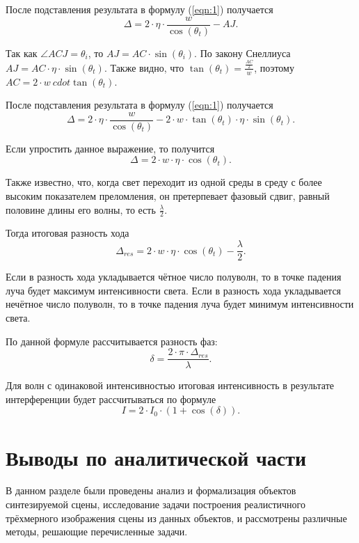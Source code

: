 После подставления результата в формулу (\ref{eqn:1}) получается
\begin{equation}
	\Delta = 2 \cdot \eta \cdot \frac{w}{\cos(\theta_t)} - AJ.
\end{equation} 

Так как $\angle{ACJ} = \theta_i$, то $AJ = AC \cdot \sin(\theta_i)$. По закону Снеллиуса $AJ = AC \cdot \eta \cdot \sin(\theta_t)$. Также видно, что $\tan(\theta_t) = \frac{\frac{AC}{2}}{w}$, поэтому $AC = 2 \cdot w \ cdot \tan(\theta_t)$.

После подставления результата в формулу (\ref{eqn:1}) получается
\begin{equation}
	\Delta = 2 \cdot \eta \cdot \frac{w}{\cos(\theta_t)} - 2 \cdot w \cdot \tan(\theta_t) \cdot \eta \cdot \sin(\theta_t).
\end{equation} 

Если упростить данное выражение, то получится
\begin{equation}
	\Delta = 2 \cdot w \cdot \eta \cdot \cos(\theta_t).
\end{equation}

Также известно, что, когда свет переходит из одной среды в среду с более высоким показателем преломления, он претерпевает фазовый сдвиг, равный половине длины его волны, то есть $\frac{\lambda}{2}$. 

Тогда итоговая разность хода
\begin{equation}
	\Delta_{res} = 2 \cdot w \cdot \eta \cdot \cos(\theta_t) - \frac{\lambda}{2}.
\end{equation}

Если в разность хода укладывается чётное число полуволн, то в точке падения луча будет максимум интенсивности света. Если в разность хода укладывается нечётное число полуволн, то в точке падения луча будет минимум интенсивности света.

По данной формуле рассчитывается разность фаз:
\begin{equation}
	\delta = \frac{2 \cdot \pi \cdot \Delta_{res}}{\lambda}.
\end{equation}

Для волн с одинаковой интенсивностью итоговая интенсивность в результате интерференции будет рассчитываться по формуле
\begin{equation}
	I = 2 \cdot I_0 \cdot (1 + \cos(\delta)).
\end{equation}

\section{Выводы по аналитической части}
В данном разделе были проведены анализ и формализация объектов синтезируемой сцены, исследование задачи построения реалистичного трёхмерного изображения сцены из данных объектов, и рассмотрены различные методы, решающие перечисленные задачи.

\newpage